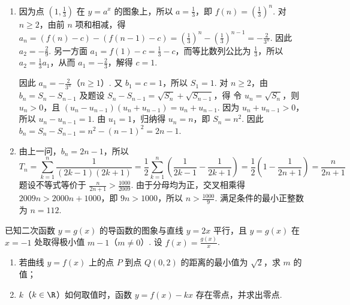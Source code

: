 \begin{solution}
\begin{enumerate}
\item 因为点 \(\left(1,\frac13\right)\) 在 \(y=a^x\) 的图象上，所以 \(a=\frac13\)，即 \(f(n)=\left(\frac13\right)^n\). 对 \(n\geq2\)，由前 \(n\) 项和相减，得
\(a_n=(f(n)-c)-(f(n-1)-c)=\left(\frac13\right)^n-\left(\frac13\right)^{n-1}=-\frac{2}{3^n}\). 因此 \(a_2=-\frac29\). 另一方面 \(a_1=f(1)-c=\frac13-c\)，而等比数列公比为 \(\frac13\)，所以 \(a_2=\frac13a_1\)，从而 \(a_1=-\frac23\)，解得 \(c=1\).

因此 \(a_n=-\frac{2}{3^n}\)（\(n\geqslant1\)）. 又 \(b_1=c=1\)，所以 \(S_1=1\). 对 \(n\geq2\)，由 \(b_n=S_n-S_{n-1}\) 及题设 \(S_n-S_{n-1}=\sqrt{S_n}+\sqrt{S_{n-1}}\)，得
令 \(u_n=\sqrt{S_n}\)，则 \(u_n>0\)，且
\((u_n-u_{n-1})(u_n+u_{n-1})=u_n+u_{n-1}\). 因为 \(u_n+u_{n-1}>0\)，所以 \(u_n-u_{n-1}=1\). 由 \(u_1=1\)，归纳得 \(u_n=n\)，即 \(S_n=n^2\). 因此
\(b_n=S_n-S_{n-1}=n^2-(n-1)^2=2n-1\).
\item 由上一问，\(b_n=2n-1\)，所以
\[
T_n=\sum_{k=1}^n\frac1{(2k-1)(2k+1)}
=\frac12\sum_{k=1}^n\left(\frac1{2k-1}-\frac1{2k+1}\right)
=\frac12\left(1-\frac1{2n+1}\right)=\frac{n}{2n+1}
\]
题设不等式等价于
\(\frac{n}{2n+1}>\frac{1000}{2009}\). 由于分母均为正，交叉相乘得 \(2009n>2000n+1000\)，即 \(9n>1000\)，所以 \(n>\frac{1000}{9}\). 满足条件的最小正整数为 \(n=112\).
\end{enumerate}
\end{solution}

\begin{problem}
已知二次函数 \(y = g(x)\) 的导函数的图象与直线 \(y = 2x\) 平行，且 \(y = g(x)\) 在 \(x = -1\) 处取得极小值 \(m - 1\)（\(m \neq 0\)）. 设 \(f(x) = \frac{g(x)}{x}\).

\begin{enumerate}
\item 若曲线 \(y = f(x)\) 上的点 \(P\) 到点 \(Q(0,2)\) 的距离的最小值为 \(\sqrt{2}\)，求 \(m\) 的值；
\item \(k\)（\(k \in \R\)）如何取值时，函数 \(y = f(x) - kx\) 存在零点，并求出零点.
\end{enumerate}
\end{problem}

